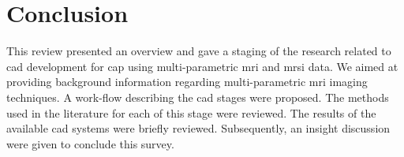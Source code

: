\section{Conclusion} \label{sec:conclusion}

This review presented an overview and gave a staging of the research related to \ac{cad} development for \ac{cap} using multi-parametric \ac{mri} and \ac{mrsi} data. We aimed at providing background information regarding multi-parametric \ac{mri} imaging techniques. A work-flow describing the \ac{cad} stages were proposed. The methods used in the literature for each of this stage were reviewed. The results of the available \ac{cad} systems were briefly reviewed. Subsequently, an insight discussion were given to conclude this survey. 